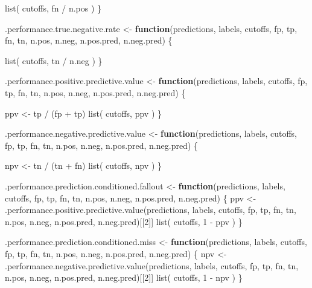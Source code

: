 \documentclass[
  letterpaper,
  DIV=11,
  numbers=noendperiod]{scrartcl}
\newenvironment{Shaded}{\begin{snugshade}}{\end{snugshade}}
\newcommand{\ControlFlowTok}[1]{\textcolor[rgb]{0.00,0.23,0.31}{\textbf{#1}}}
\newcommand{\DecValTok}[1]{\textcolor[rgb]{0.68,0.00,0.00}{#1}}
\newcommand{\FunctionTok}[1]{\textcolor[rgb]{0.28,0.35,0.67}{#1}}
\newcommand{\NormalTok}[1]{\textcolor[rgb]{0.00,0.23,0.31}{#1}}
\newcommand{\OtherTok}[1]{\textcolor[rgb]{0.00,0.23,0.31}{#1}}
\newcommand{\SpecialCharTok}[1]{\textcolor[rgb]{0.37,0.37,0.37}{#1}}
\begin{document}
\begin{Shaded}
\begin{Highlighting}[]
      \FunctionTok{list}\NormalTok{( cutoffs, fn }\SpecialCharTok{/}\NormalTok{ n.pos )}
\NormalTok{  \}}

\NormalTok{.performance.true.negative.rate }\OtherTok{\textless{}{-}}
  \ControlFlowTok{function}\NormalTok{(predictions, labels, cutoffs, fp, tp, fn, tn,}
\NormalTok{           n.pos, n.neg, n.pos.pred, n.neg.pred) \{}
    
      \FunctionTok{list}\NormalTok{( cutoffs, tn }\SpecialCharTok{/}\NormalTok{ n.neg )}
\NormalTok{  \}}

\NormalTok{.performance.positive.predictive.value }\OtherTok{\textless{}{-}}
  \ControlFlowTok{function}\NormalTok{(predictions, labels, cutoffs, fp, tp, fn, tn,}
\NormalTok{           n.pos, n.neg, n.pos.pred, n.neg.pred) \{}
    
\NormalTok{      ppv }\OtherTok{\textless{}{-}}\NormalTok{ tp }\SpecialCharTok{/}\NormalTok{ (fp }\SpecialCharTok{+}\NormalTok{ tp)}
      \FunctionTok{list}\NormalTok{( cutoffs, ppv )}
\NormalTok{  \}}

\NormalTok{.performance.negative.predictive.value }\OtherTok{\textless{}{-}}
  \ControlFlowTok{function}\NormalTok{(predictions, labels, cutoffs, fp, tp, fn, tn,}
\NormalTok{           n.pos, n.neg, n.pos.pred, n.neg.pred) \{}
    
\NormalTok{      npv }\OtherTok{\textless{}{-}}\NormalTok{ tn }\SpecialCharTok{/}\NormalTok{ (tn }\SpecialCharTok{+}\NormalTok{ fn)}
      \FunctionTok{list}\NormalTok{( cutoffs, npv )}
\NormalTok{  \}}

\NormalTok{.performance.prediction.conditioned.fallout }\OtherTok{\textless{}{-}}
  \ControlFlowTok{function}\NormalTok{(predictions, labels, cutoffs, fp, tp, fn, tn,}
\NormalTok{           n.pos, n.neg, n.pos.pred, n.neg.pred) \{}
\NormalTok{      ppv }\OtherTok{\textless{}{-}} \FunctionTok{.performance.positive.predictive.value}\NormalTok{(predictions, labels,}
\NormalTok{                                                    cutoffs, fp, tp, fn, tn,}
\NormalTok{                                                    n.pos, n.neg, n.pos.pred,}
\NormalTok{                                                    n.neg.pred)[[}\DecValTok{2}\NormalTok{]]}
      \FunctionTok{list}\NormalTok{( cutoffs, }\DecValTok{1} \SpecialCharTok{{-}}\NormalTok{ ppv )}
\NormalTok{  \}}

\NormalTok{.performance.prediction.conditioned.miss }\OtherTok{\textless{}{-}}
  \ControlFlowTok{function}\NormalTok{(predictions, labels, cutoffs, fp, tp, fn, tn,}
\NormalTok{           n.pos, n.neg, n.pos.pred, n.neg.pred) \{}
\NormalTok{      npv }\OtherTok{\textless{}{-}} \FunctionTok{.performance.negative.predictive.value}\NormalTok{(predictions, labels,}
\NormalTok{                                                    cutoffs, fp, tp, fn, tn,}
\NormalTok{                                                    n.pos, n.neg, n.pos.pred,}
\NormalTok{                                                    n.neg.pred)[[}\DecValTok{2}\NormalTok{]]}
      \FunctionTok{list}\NormalTok{( cutoffs, }\DecValTok{1} \SpecialCharTok{{-}}\NormalTok{ npv )}
\NormalTok{  \}}


\end{Highlighting}
\end{Shaded}
\end{document}
